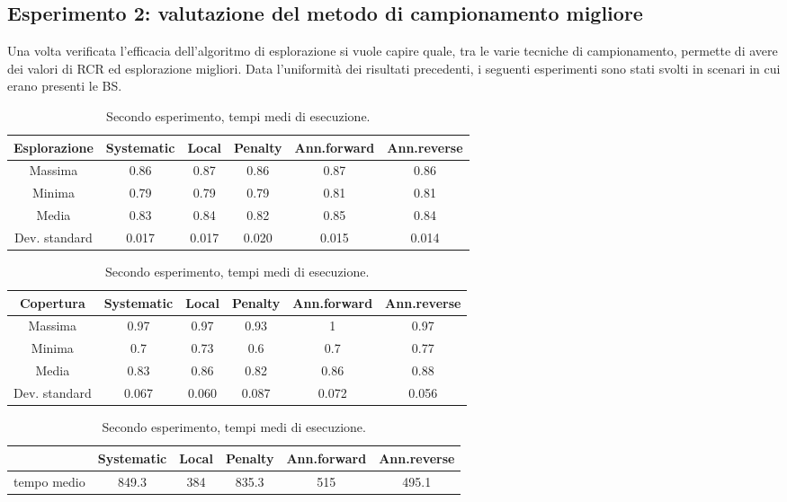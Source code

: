 \subsection{Esperimento 2: valutazione del metodo di campionamento migliore}\label{subsec:exp2}
Una volta verificata l'efficacia dell'algoritmo di esplorazione si vuole capire quale, tra le varie tecniche di campionamento, permette di avere dei valori di RCR ed esplorazione migliori.
Data l'uniformità dei risultati precedenti, i seguenti esperimenti sono stati svolti in scenari in cui erano presenti le BS.

\begin{table}[p]
\centering
\begin{tabular}{|c|c|c|c|c|c|}
\hline
Esplorazione & Systematic & Local & Penalty & Ann.forward & Ann.reverse \\
\hline
Massima & 0.86 & 0.87 & 0.86 & 0.87 & 0.86 \\
Minima & 0.79 & 0.79 & 0.79 & 0.81 & 0.81 \\
Media & 0.83 & 0.84 & 0.82 & 0.85 & 0.84 \\
Dev. standard & 0.017 & 0.017 & 0.020 & 0.015 & 0.014 \\
\hline
\end{tabular}
\caption{\label{tab:exp2_expl_statistics}Secondo esperimento, indici dei valori finali di esplorazione.}

\vspace*{0.5 cm}

\begin{tabular}{|c|c|c|c|c|c|}
\hline
Copertura & Systematic & Local & Penalty & Ann.forward & Ann.reverse \\
\hline
Massima & 0.97 & 0.97 & 0.93 & 1 & 0.97 \\
Minima & 0.7 & 0.73 & 0.6 & 0.7 & 0.77 \\
Media & 0.83 & 0.86 & 0.82 & 0.86 & 0.88 \\
Dev. standard & 0.067 & 0.060 & 0.087 & 0.072 & 0.056 \\
\hline
\end{tabular}
\caption{\label{tab:exp2_cov_statistics}Secondo esperimento, indici dei valori finali di copertura.}

\vspace*{0.5 cm}

\begin{tabular}{|c|c|c|c|c|c|}
\hline
 & Systematic & Local & Penalty & Ann.forward & Ann.reverse \\
\hline
tempo medio & 849.3 & 384 & 835.3 & 515 & 495.1 \\
\hline
\end{tabular}
\caption{\label{tab:exp2_time comparison}
Secondo esperimento, tempi medi di esecuzione.}
\end{table}

